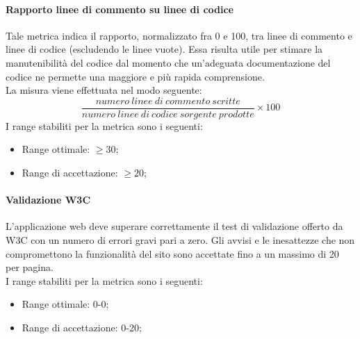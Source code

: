 			\paragraph{Rapporto linee di commento su linee di codice}
			Tale metrica indica il rapporto, normalizzato fra 0 e 100, tra linee di commento e linee di codice (escludendo le linee vuote).
			Essa risulta utile per stimare la manutenibilità del codice dal momento che un'adeguata documentazione del codice ne permette una maggiore e più rapida comprensione.
			\\La misura viene effettuata nel modo seguente:
			\begin{equation}
					\frac{numero~linee~di~commento~scritte}{numero~linee~di~codice~sorgente~prodotte}\times{100}
				\end{equation}
			I range stabiliti per la metrica sono i seguenti:
			\begin{itemize}
				\item Range ottimale: $\geq{30}$;
				\item Range di accettazione: $\geq{20}$;
			\end{itemize}
			
			\paragraph{Validazione W3C}
			L'applicazione web deve superare correttamente il test di validazione offerto da W3C con un numero di errori gravi pari a zero. Gli avvisi e le inesattezze che non compromettono la funzionalità del sito sono accettate fino a un massimo di 20 per pagina.
			\\I range stabiliti per la metrica sono i seguenti:
			\begin{itemize}
				\item Range ottimale: 0-0;
				\item Range di accettazione: 0-20;
			\end{itemize}
	

